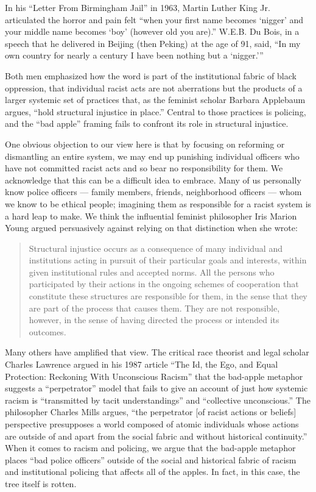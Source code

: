 In his ``Letter From Birmingham Jail'' in 1963, Martin Luther King Jr.
articulated the horror and pain felt ``when your first name becomes
`nigger' and your middle name becomes `boy' (however old you are).''
W.E.B. Du Bois, in a speech that he delivered in Beijing (then Peking)
at the age of 91, said, ``In my own country for nearly a century I have
been nothing but a `nigger.'''

Both men emphasized how the word is part of the institutional fabric of
black oppression, that individual racist acts are not aberrations but
the products of a larger systemic set of practices that, as the feminist
scholar Barbara Applebaum argues, ``hold structural injustice in
place.'' Central to those practices is policing, and the ``bad apple''
framing fails to confront its role in structural injustice.

One obvious objection to our view here is that by focusing on reforming
or dismantling an entire system, we may end up punishing individual
officers who have not committed racist acts and so bear no
responsibility for them. We acknowledge that this can be a difficult
idea to embrace. Many of us personally know police officers --- family
members, friends, neighborhood officers --- whom we know to be ethical
people; imagining them as responsible for a racist system is a hard leap
to make. We think the influential feminist philosopher Iris Marion Young
argued persuasively against relying on that distinction when she wrote:

\begin{quote}
Structural injustice occurs as a consequence of many individual and
institutions acting in pursuit of their particular goals and interests,
within given institutional rules and accepted norms. All the persons who
participated by their actions in the ongoing schemes of cooperation that
constitute these structures are responsible for them, in the sense that
they are part of the process that causes them. They are not responsible,
however, in the sense of having directed the process or intended its
outcomes.
\end{quote}

Many others have amplified that view. The critical race theorist and
legal scholar Charles Lawrence argued in his 1987 article ``The Id, the
Ego, and Equal Protection: Reckoning With Unconscious Racism'' that the
bad-apple metaphor suggests a ``perpetrator'' model that fails to give
an account of just how systemic racism is ``transmitted by tacit
understandings'' and ``collective unconscious.'' The philosopher Charles
Mills argues, ``the perpetrator {[}of racist actions or beliefs{]}
perspective presupposes a world composed of atomic individuals whose
actions are outside of and apart from the social fabric and without
historical continuity.'' When it comes to racism and policing, we argue
that the bad-apple metaphor places ``bad police officers'' outside of
the social and historical fabric of racism and institutional policing
that affects all of the apples. In fact, in this case, the tree itself
is rotten.

